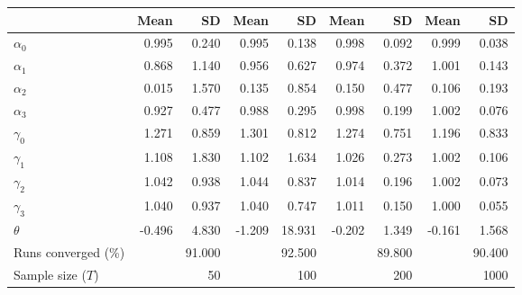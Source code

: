 
\begin{tabular}[t]{lrrrrrrrr}
\toprule
  & Mean & SD & Mean  & SD  & Mean   & SD   & Mean    & SD   \\
\midrule
$\alpha_{0}$ & 0.995 & 0.240 & 0.995 & 0.138 & 0.998 & 0.092 & 0.999 & 0.038\\
$\alpha_{1}$ & 0.868 & 1.140 & 0.956 & 0.627 & 0.974 & 0.372 & 1.001 & 0.143\\
$\alpha_{2}$ & 0.015 & 1.570 & 0.135 & 0.854 & 0.150 & 0.477 & 0.106 & 0.193\\
$\alpha_{3}$ & 0.927 & 0.477 & 0.988 & 0.295 & 0.998 & 0.199 & 1.002 & 0.076\\
$\gamma_{0}$ & 1.271 & 0.859 & 1.301 & 0.812 & 1.274 & 0.751 & 1.196 & 0.833\\
$\gamma_{1}$ & 1.108 & 1.830 & 1.102 & 1.634 & 1.026 & 0.273 & 1.002 & 0.106\\
$\gamma_{2}$ & 1.042 & 0.938 & 1.044 & 0.837 & 1.014 & 0.196 & 1.002 & 0.073\\
$\gamma_{3}$ & 1.040 & 0.937 & 1.040 & 0.747 & 1.011 & 0.150 & 1.000 & 0.055\\
$\theta$ & -0.496 & 4.830 & -1.209 & 18.931 & -0.202 & 1.349 & -0.161 & 1.568\\
Runs converged (\%) &  & 91.000 &  & 92.500 &  & 89.800 &  & 90.400\\
Sample size ($T$) &  & 50 &  & 100 &  & 200 &  & 1000\\
\bottomrule
\end{tabular}
